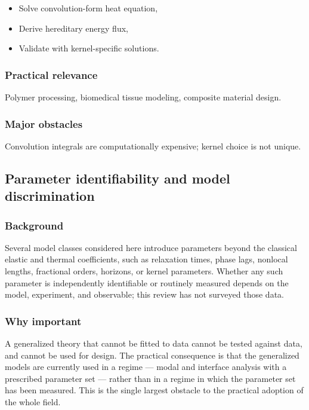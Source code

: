 \begin{itemize}
\item Solve convolution-form heat equation,
\item Derive hereditary energy flux,
\item Validate with kernel-specific solutions.
\end{itemize}

\subsubsection{Practical relevance}

Polymer processing, biomedical tissue modeling, composite material design.

\subsubsection{Major obstacles}

Convolution integrals are computationally expensive; kernel choice is not unique.

\subsection{Parameter identifiability and model discrimination}
\label{sec:15.8}

\subsubsection{Background}

Several model classes considered here introduce parameters beyond the classical elastic and thermal coefficients, such as relaxation times, phase lags, nonlocal lengths, fractional orders, horizons, or kernel parameters. Whether any such parameter is independently identifiable or routinely measured depends on the model, experiment, and observable; this review has not surveyed those data.

\subsubsection{Why important}

A generalized theory that cannot be fitted to data cannot be tested against data, and cannot be used for design. The practical consequence is that the generalized models are currently used in a regime --- modal and interface analysis with a prescribed parameter set --- rather than in a regime in which the parameter set has been measured. This is the single largest obstacle to the practical adoption of the whole field.

